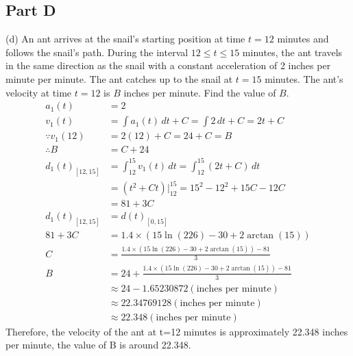 \documentclass{article}
\begin{document}
\subsection{Part D}
(d) An ant arrives at the snail's starting position at time $t=12$ minutes and follows the snail's path. During the interval $12\leq t\leq 15$ minutes, the ant travels in the same direction as the snail with a constant acceleration of 2 inches per minute per minute. The ant catches up to the snail at $t=15$ minutes. The ant's velocity at time $t=12$ is $B$ inches per minute. Find the value of $B$. 
\begin{align*}
    a_1(t)&=2\\
    v_1(t)&=\int a_1(t) \, dt + C = \int 2 \, dt + C = 2t + C\\
    \because v_1(12)&=2(12)+C=24+C=B\\
    \therefore B&=C+24\\
    d_1(t)_{[12,15]} &= \int_{12}^{15} v_1(t) \, dt = \int_{12}^{15} (2t+C) \, dt\\
    &= (t^2+Ct)\bigg|_{12}^{15} = 15^2-12^2+15C-12C\\
    &=81+3C\\
    d_1(t)_{[12,15]} &= d(t)_{[0,15]}\\
    81+3C &=1.4\times (15\ln(226)-30+2\arctan(15))\\
    C &= \frac{1.4\times (15\ln(226)-30+2\arctan(15))-81}{3}\\
    B &= 24 + \frac{1.4\times (15\ln(226)-30+2\arctan(15))-81}{3}\\
    &\approx 24-1.65230872 (\text{inches per minute})\\
    &\approx 22.34769128 (\text{inches per minute})\\
    &\approx 22.348 (\text{inches per minute})
    \end{align*}
Therefore, the velocity of the ant at t=12 minutes is approximately 22.348 inches per minute, the value of B is around 22.348. 
\end{document}
